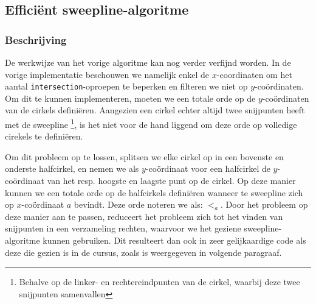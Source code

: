 \documentclass[12pt]{article}
\begin{document}
\subsection{Efficiënt sweepline-algoritme}
\subsubsection{Beschrijving}
De werkwijze van het vorige algoritme kan nog verder verfijnd worden. In de vorige implementatie beschouwen we namelijk enkel de $ x $-coordinaten om het aantal \texttt{intersection}-oproepen te beperken en filteren we niet op $ y $-coördinaten. Om dit te kunnen implementeren, moeten we een totale orde op de $ y $-coördinaten van de cirkels definiëren. Aangezien een cirkel echter altijd twee snijpunten heeft met de sweepline \footnote{Behalve op de linker- en rechtereindpunten van de cirkel, waarbij deze twee snijpunten samenvallen}, is het niet voor de hand liggend om deze orde op volledige cirekels te definiëren. 

Om dit probleem op te lossen, splitsen we elke cirkel op in een bovenste en onderste halfcirkel, en nemen we als $ y $-coördinaat voor een halfcirkel de $ y$-coördinaat van het resp. hoogste en laagste punt op de cirkel. Op deze manier kunnen we een totale orde op de halfcirkels definiëren wanneer te sweepline zich op $x$-coördinaat $ a $ bevindt. Deze orde noteren we als: $ <_a $. Door het probleem op deze manier aan te passen, reduceert het probleem zich tot het vinden van snijpunten in een verzameling rechten, waarvoor we het geziene sweepline-algoritme kunnen gebruiken. Dit resulteert dan ook in zeer gelijkaardige code als deze die gezien is in de cursus, zoals is weergegeven in volgende paragraaf. 

\newpage
\thispagestyle{empty}
\end{document}

